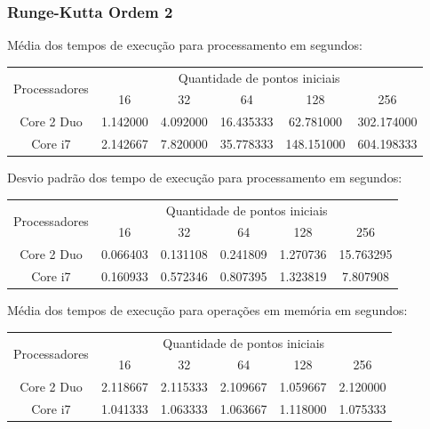     \subsubsection{Runge-Kutta Ordem 2}
    Média dos tempos de execução para processamento em segundos:\\
    \begin{tabular}{| c | c | c | c | c | c |}
      \hline
      \multirow{2}{*}{Processadores}& \multicolumn{5}{|c|}{Quantidade de pontos iniciais} \\ \cline{2-6}
      & 16 & 32 & 64 & 128 & 256 \\ \hline
      Core 2 Duo & 1.142000 & 4.092000 & 16.435333 & 62.781000 & 302.174000 \\ \hline
      Core i7 & 2.142667 & 7.820000 & 35.778333 & 148.151000 & 604.198333\\ \hline

      \hline
    \end{tabular}
    
    \hspace{1mm}\newline
    
    \noindent Desvio padrão dos tempo de execução para processamento em segundos:\\
    \begin{tabular}{| c | c | c | c | c | c |}
      \hline
      \multirow{2}{*}{Processadores}& \multicolumn{5}{|c|}{Quantidade de pontos iniciais} \\ \cline{2-6}
      & 16 & 32 & 64 & 128 & 256 \\ \hline
      Core 2 Duo & 0.066403 & 0.131108 & 0.241809 & 1.270736 & 15.763295 \\ \hline
      Core i7 &  0.160933 & 0.572346 & 0.807395 & 1.323819 & 7.807908 \\ \hline

      \hline
    \end{tabular}
    
    \hspace{1mm}\newline
    
    \noindent Média dos tempos de execução para operações em memória em segundos:\\
    \begin{tabular}{| c | c | c | c | c | c |}
      \hline
      \multirow{2}{*}{Processadores}& \multicolumn{5}{|c|}{Quantidade de pontos iniciais} \\ \cline{2-6}
      & 16 & 32 & 64 & 128 & 256 \\ \hline
      Core 2 Duo & 2.118667 & 2.115333 & 2.109667 & 1.059667 & 2.120000 \\ \hline
      Core i7 & 1.041333 & 1.063333 & 1.063667 & 1.118000 & 1.075333\\ \hline

      \hline
    \end{tabular}
    
